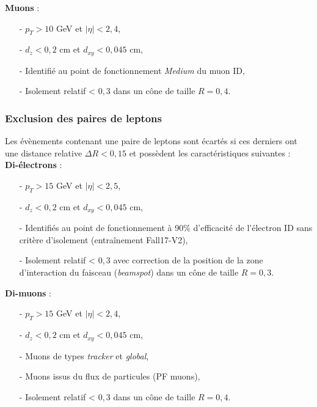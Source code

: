 \textbf{Muons} :

\begin{itemize}
\bigskip
    \item[-] $p_{T}>10$ GeV et $|\eta|<2,4$,
        \smallskip
    \item[-] $d_z<0,2$ cm et $d_{xy}<0,045$ cm,
        \smallskip
    \item[-] Identifié au point de fonctionnement \textit{Medium} du muon ID,
        \smallskip
    \item[-] Isolement relatif < $0,3$ dans un cône de taille $R=0,4$. 
    \bigskip
\end{itemize}

\subsubsection{ Exclusion des paires de leptons}

Les évènements contenant une paire de leptons sont écartés si ces derniers ont une distance relative $\Delta R<0,15$ et possèdent les caractéristiques suivantes : \\

\textbf{Di-électrons} :

\begin{itemize}
\bigskip
    \item[-] $p_{T}>15$ GeV et $|\eta|<2,5$,
        \smallskip
    \item[-] $d_z<0,2$ cm et $d_{xy}<0,045$ cm,
        \smallskip
    \item[-] Identifiés au point de fonctionnement à 90\% d'efficacité de l'électron ID sans critère d'isolement (entraînement Fall17-V2),
        \smallskip
    \item[-] Isolement relatif < $0,3$ avec correction de la position de la zone d'interaction du faisceau (\textit{beamspot}) dans un cône de taille $R=0,3$. 
    \bigskip
\end{itemize}

\textbf{Di-muons} :

\begin{itemize}
\bigskip
    \item[-] $p_{T}>15$ GeV et $|\eta|<2,4$,
        \smallskip
    \item[-] $d_z<0,2$ cm et $d_{xy}<0,045$ cm,
        \smallskip
    \item[-] Muons de types \textit{tracker} et \textit{global},
        \smallskip
    \item[-] Muons issus du flux de particules (PF muons),
        \smallskip
    \item[-] Isolement relatif < $0,3$ dans un cône de taille $R=0,4$. 
    \bigskip
\end{itemize}

